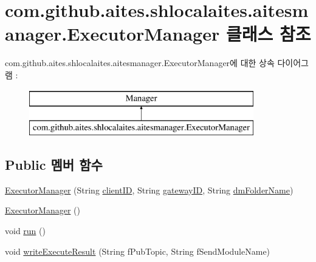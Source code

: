 \hypertarget{classcom_1_1github_1_1aites_1_1shlocalaites_1_1aitesmanager_1_1_executor_manager}{}\section{com.\+github.\+aites.\+shlocalaites.\+aitesmanager.\+Executor\+Manager 클래스 참조}
\label{classcom_1_1github_1_1aites_1_1shlocalaites_1_1aitesmanager_1_1_executor_manager}
com.\+github.\+aites.\+shlocalaites.\+aitesmanager.\+Executor\+Manager에 대한 상속 다이어그램 \+: \begin{figure}[H]
\begin{center}
\leavevmode
\includegraphics[height=2.000000cm]{classcom_1_1github_1_1aites_1_1shlocalaites_1_1aitesmanager_1_1_executor_manager}
\end{center}
\end{figure}
\subsection*{Public 멤버 함수}
\begin{DoxyCompactItemize}
\item 
\mbox{\hyperlink{classcom_1_1github_1_1aites_1_1shlocalaites_1_1aitesmanager_1_1_executor_manager_accd8f9be46aa5f95f80456e5f8a159a6}{Executor\+Manager}} (String \mbox{\hyperlink{classcom_1_1github_1_1aites_1_1shlocalaites_1_1aitesmanager_1_1_executor_manager_a13e89e7736ea367f5c0d986e92b417c9}{client\+ID}}, String \mbox{\hyperlink{classcom_1_1github_1_1aites_1_1shlocalaites_1_1aitesmanager_1_1_executor_manager_a709d51cfc2be8075a91702475aa1374f}{gateway\+ID}}, String \mbox{\hyperlink{classcom_1_1github_1_1aites_1_1shlocalaites_1_1aitesmanager_1_1_executor_manager_a83a9c2334b9cc2cbca87772d2e4cae35}{dm\+Folder\+Name}})
\item 
\mbox{\hyperlink{classcom_1_1github_1_1aites_1_1shlocalaites_1_1aitesmanager_1_1_executor_manager_ab46c4891117f7f6d359893b1a51b9678}{Executor\+Manager}} ()
\item 
void \mbox{\hyperlink{classcom_1_1github_1_1aites_1_1shlocalaites_1_1aitesmanager_1_1_executor_manager_a9fe7a73a19b73a3b02a2a93b26f10605}{run}} ()
\item 
void \mbox{\hyperlink{classcom_1_1github_1_1aites_1_1shlocalaites_1_1aitesmanager_1_1_executor_manager_a37779d9aad0db63aaf005ceecb5bdc74}{write\+Execute\+Result}} (String f\+Pub\+Topic, String f\+Send\+Module\+Name)
\end{DoxyCompactItemize}
